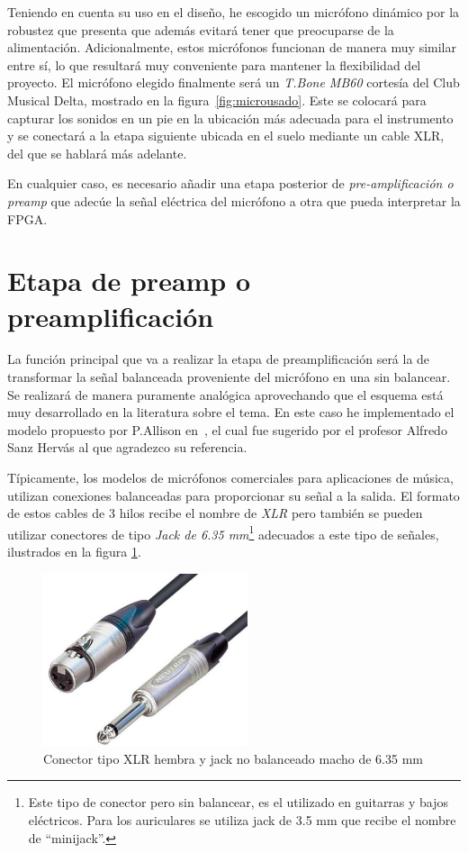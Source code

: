 Teniendo en cuenta su uso en el diseño, he escogido un micrófono dinámico por la robustez que presenta que además evitará tener que preocuparse de la alimentación. Adicionalmente, estos micrófonos funcionan de manera muy similar entre sí, lo que resultará muy conveniente para mantener la flexibilidad del proyecto. El micrófono elegido finalmente será un \emph{T.Bone MB60} \cite{tbonemic} cortesía del Club Musical Delta, mostrado en la figura~\ref{fig:microusado}. Este se colocará para capturar los sonidos en un pie en la ubicación más adecuada para el instrumento y se conectará a la etapa siguiente ubicada en el suelo mediante un cable XLR, del que se hablará más adelante.

En cualquier caso, es necesario añadir una etapa posterior de \emph{pre-amplificación o preamp} que adecúe la señal eléctrica del micrófono a otra que pueda interpretar la FPGA. 

\section{Etapa de preamp o preamplificación}

La función principal que va a realizar la etapa de preamplificación será la de transformar la señal balanceada proveniente del micrófono en una sin balancear. Se realizará de manera puramente analógica aprovechando que el esquema está muy desarrollado en la literatura sobre el tema. En este caso he implementado el modelo propuesto por P.Allison en~\cite{Preamp}, el cual fue sugerido por el profesor Alfredo Sanz Hervás al que agradezco su referencia.

Típicamente, los modelos de micrófonos comerciales para aplicaciones de música, utilizan conexiones balanceadas para proporcionar su señal a la salida. El formato de estos cables de 3 hilos recibe el nombre de \emph{XLR} pero también se pueden utilizar conectores de tipo \emph{Jack de 6.35 mm}\footnote{Este tipo de conector pero sin balancear, es el utilizado en guitarras y bajos eléctricos. Para los auriculares se utiliza jack de 3.5 mm que recibe el nombre de ``minijack''.} adecuados a este tipo de señales, ilustrados en la figura \ref{fig:conec}.

\begin{figure}[!htb]
\begin{center}
\includegraphics[width=6cm]{img/canonyjack.png}
\caption{\label{fig:conec}Conector tipo XLR hembra y jack no balanceado macho de 6.35 mm}
\end{center}
\end{figure}

